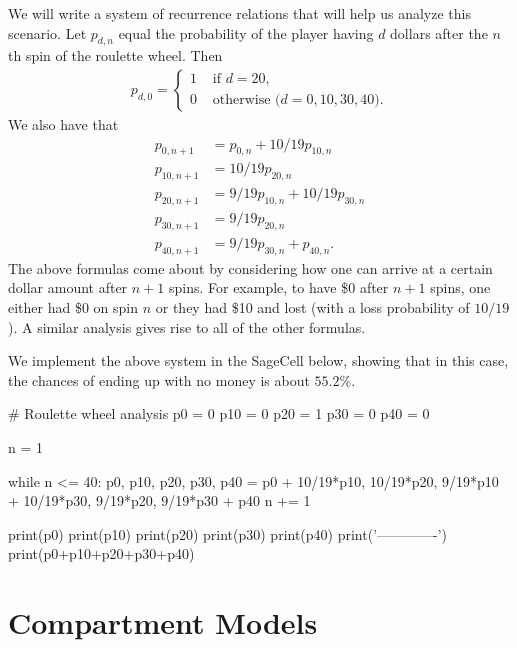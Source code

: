 \documentclass{ximera}
\begin{document}
We will write a system of recurrence relations that will help us
analyze this scenario. Let $p_{d,n}$ equal the probability of the 
player having $d$ dollars after the $n$th spin of the roulette wheel.
Then
\begin{align}
	p_{d,0} = \begin{cases} 1 & \text{ if $d=20$,}\\
                                0 & \text{ otherwise ($d=0,10,30,40$).}
		  \end{cases}
\end{align}
We also have that
\begin{align}
	p_{0,n+1}  &= p_{0,n} + 10/19p_{10,n}\\
	p_{10,n+1} &= 10/19p_{20,n}\\
	p_{20,n+1} &= 9/19p_{10,n} + 10/19p_{30,n}\\
	p_{30,n+1} &= 9/19p_{20,n}\\
	p_{40,n+1} &= 9/19p_{30,n} + p_{40,n}.
\end{align}
The above formulas come about by considering how one can arrive at a certain
dollar amount after $n+1$ spins. For example, to have \$0 after $n+1$ 
spins, one either had \$0 on spin $n$ or they had \$10 and lost (with a
loss probability of $10/19$). A similar analysis gives rise to all of
the other formulas.

We implement the above system in the SageCell below, showing that in this
case, the chances of ending up with no money is about $55.2\%$.

\begin{sageCell}
# Roulette wheel analysis
p0 = 0
p10 = 0
p20 = 1
p30 = 0
p40 = 0

n = 1

while n <= 40:
    p0, p10, p20, p30, p40 = p0 + 10/19*p10, 10/19*p20, 9/19*p10 + 10/19*p30, 9/19*p20, 9/19*p30 + p40
    n += 1

print(p0)
print(p10)
print(p20)
print(p30)
print(p40)
print('-------------')
print(p0+p10+p20+p30+p40)
\end{sageCell}

\section{Compartment Models}
\end{document}
